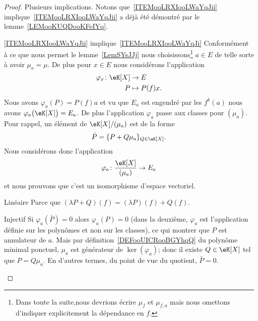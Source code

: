 \begin{proof}
    Plusieurs implications. Notons que~\ref{ITEMooLRXIooLWaYqJii} implique~\ref{ITEMooLRXIooLWaYqJii} a déjà été démontré par le lemme~\ref{LEMooKUQDooKFeIYq}.
    \begin{subproof}
        \item[\ref{ITEMooLRXIooLWaYqJii} implique~\ref{ITEMooLRXIooLWaYqJi}]
            Conformément à ce que nous permet le lemme~\ref{LemSYsJJj} nous choisissons\footnote{Dans toute la suite,nous devrions écrire \( \mu_f\) et \( \mu_{f,a}\) mais nous omettons d'indiquer explicitement la dépendance en \( f\).} \( a\in E\) de telle sorte à avoir \( \mu_a=\mu\). De plus pour \( x\in E\) nous considérons l'application
            \begin{equation}
                \begin{aligned}
                    \varphi_x\colon \eK[X]&\to E \\
                    P&\mapsto P(f)x.
                \end{aligned}
            \end{equation}
            Nous avons \( \varphi_a(P)=P(f)a\) et vu que \( E_{a}\) est engendré par les \( f^k(a)\) nous avons \( \varphi_a\big( \eK[X] \big)=E_a\). De plus l'application \( \varphi_a\) passe aux classes pour \( (\mu_a)\). Pour rappel, un élément de \( \eK[X]/(\mu_a)\) est de la forme
            \begin{equation}
                \bar P=\{ P+Q\mu_a \}_{Q\in \eK[X]}.
            \end{equation}
            Nous considérons donc l'application
            \begin{equation}
                \varphi_a\colon \frac{ \eK[X] }{ (\mu_a) }\to E_a
            \end{equation}
            et nous prouvons que c'est un isomorphisme d'espace vectoriel.
            \begin{subproof}
                \item[Linéaire]
                    Parce que \( (\lambda P+Q)(f)=(\lambda P)(f)+Q(f)\).
                \item[Injectif]
                    Si \( \varphi_a(\bar P)=0\) alors \( \varphi_a(P)=0\) (dans la deuxième, \( \varphi_a\) est l'application définie sur les polynômes et non sur les classes), ce qui montrer que \( P\) est annulateur de \( a\). Mais par définition~\ref{DEFooUICRooBGYhqQ} du polynôme minimal ponctuel, \( \mu_a\) est générateur de \( \ker(\varphi_a)\); donc il existe \( Q\in \eK[X]\) tel que \( P=Q\mu_a\). En d'autres termes, du point de vue du quotient, \( \bar P=0\).

\end{subproof}
\end{subproof}
\end{proof}
